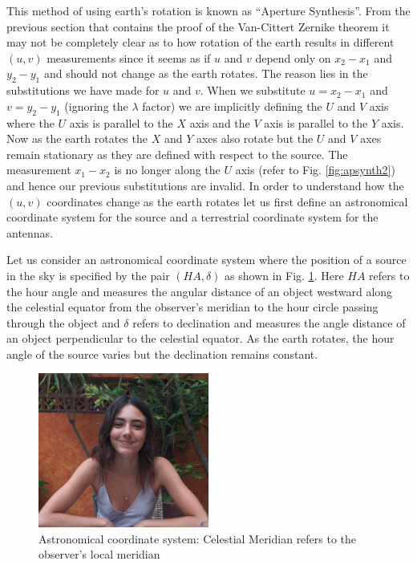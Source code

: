 This method of using earth's rotation is known as ``Aperture Synthesis''. From the previous section that contains the proof of the Van-Cittert Zernike theorem it may not be completely clear as to how rotation of the earth results in different $(u,v)$ measurements since it seems as if $u$ and $v$ depend only on  $x_2 - x_1$ and $y_2 - y_1$ and should not change as the earth rotates. The reason lies in the substitutions we have made for $u$ and $v$. When we substitute $u = x_2 - x_1$ and $v = y_2 - y_1$ (ignoring the $\lambda$ factor) we are implicitly defining the $U$ and $V$ axis where the $U$ axis is parallel to the $X$ axis and the $V$ axis is parallel to the $Y$ axis. Now as the earth rotates the $X$ and $Y$ axes also rotate but the $U$ and $V$ axes remain stationary as they are defined with respect to the source. The measurement $x_1-x_2$ is no longer along the $U$ axis (refer to Fig. \ref{fig:apsynth2}) and hence our previous substitutions are invalid. In order to understand how the $(u,v)$ coordinates change as the earth rotates let us first define an astronomical coordinate system for the source and a terrestrial coordinate system for the antennas.


Let us consider an astronomical coordinate system where the position of a source in the sky is specified by the pair $(HA , \delta)$ as shown in Fig. \ref{fig:hourangle}. Here $HA$ refers to the hour angle and measures the angular distance of an object westward along the celestial equator from the observer's meridian to the hour circle passing through the object and $\delta$ refers to declination and measures the angle distance of an object perpendicular to the celestial equator. As the earth rotates, the hour angle of the source varies but the declination remains constant.

\begin{figure}[!h]
	\centering \vspace{-0.1in}
	\includegraphics[width=0.5\textwidth]{images/hourangle.png}	
	\caption[Astronomical coordinate system]{\small Astronomical coordinate system: Celestial Meridian refers to the observer's local meridian  \footnotemark}
	\label{fig:hourangle}
\end{figure}


